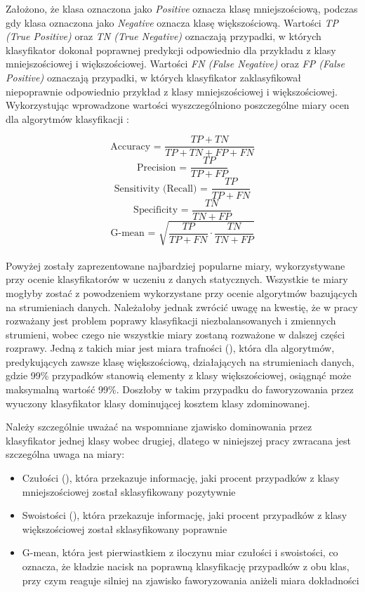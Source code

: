 \noindent Założono, że klasa oznaczona jako \textit{Positive} oznacza klasę mniejszościową, podczas gdy klasa oznaczona jako \textit{Negative} oznacza klasę większościową. Wartości \textit{TP (True Positive)} oraz \textit{TN (True Negative)} oznaczają przypadki, w których klasyfikator dokonał poprawnej predykcji odpowiednio dla przykładu z klasy mniejszościowej i większościowej. Wartości \textit{FN (False Negative)} oraz \textit{FP (False Positive)} oznaczają przypadki, w których klasyfikator zaklasyfikował niepoprawnie odpowiednio przykład z klasy mniejszościowej i większościowej. Wykorzystując wprowadzone wartości wyszczególniono poszczególne miary ocen dla algorytmów klasyfikacji \cite{Inbook:Metrics}:

$$\textrm{Accuracy = }\frac{TP + TN}{TP + TN + FP + FN}$$
$$\textrm{Precision = }\frac{TP}{TP + FP}$$
$$\textrm{Sensitivity (Recall) = }\frac{TP}{TP + FN}$$
$$\textrm{Specificity = }\frac{TN}{TN + FP}$$
$$\textrm{G-mean = }\sqrt{\frac{TP}{TP + FN} \cdot \frac{TN}{TN + FP}}$$\\

\noindent Powyżej zostały zaprezentowane najbardziej popularne miary, wykorzystywane przy ocenie klasyfikatorów w uczeniu z danych statycznych. Wszystkie te miary mogłyby zostać z powodzeniem wykorzystane przy ocenie algorytmów bazujących na strumieniach danych. Należałoby jednak zwrócić uwagę na kwestię, że w pracy rozważany jest problem poprawy klasyfikacji niezbalansowanych i zmiennych strumieni, wobec czego nie wszystkie miary zostaną rozważone w dalszej części rozprawy. Jedną z takich miar jest miara trafności (), która dla algorytmów, predykujących zawsze klasę większościową, działających na strumieniach danych, gdzie 99\% przypadków stanowią elementy z klasy większościowej, osiągnąć może maksymalną wartość 99\%. Doszłoby w takim przypadku do faworyzowania przez wyuczony klasyfikator klasy dominującej kosztem klasy zdominowanej.

Należy szczególnie uważać na wspomniane zjawisko dominowania przez klasyfikator jednej klasy wobec drugiej, dlatego w niniejszej pracy zwracana jest szczególna uwaga na miary:

\begin{itemize}
    \item Czułości (), która przekazuje informację, jaki procent przypadków z klasy mniejszościowej został sklasyfikowany pozytywnie
    \item Swoistości (), która przekazuje informację, jaki procent przypadków z klasy większościowej został sklasyfikowany poprawnie
    \item G-mean, która jest pierwiastkiem z iloczynu miar czułości i swoistości, co oznacza, że kładzie nacisk na poprawną klasyfikację przypadków z obu klas, przy czym reaguje silniej na zjawisko faworyzowania aniżeli miara dokładności
\end{itemize}

